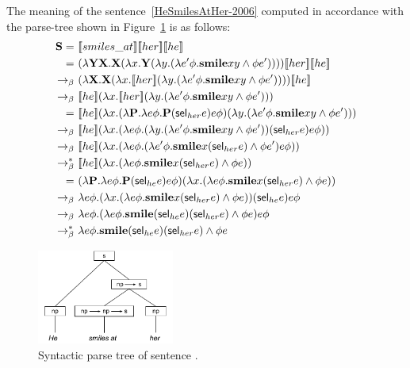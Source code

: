 \begin{example} \label{ex:2006:HeSmilesAtHer} The meaning of the sentence~\eqref{HeSmilesAtHer-2006} computed in accordance with the parse-tree shown in Figure~\ref{fig:ptS3-2006}  is as follows:
\begin{align}
\S = \ & \I{smiles\_at} \I{her} \I{he} \notag \\
 = \ & (\lambda \Y2 \X2. \X2( \lambda \x1. \Y2 (\lambda \y1. ( \lambda e' \phi. \textbf{smile} \x1 \y1 \land \phi e' ))) )  \I{her} \I{he} \notag \\
\bconv \ & (\lambda  \X2. \X2( \lambda \x1.  \I{her}  (\lambda \y1. ( \lambda e' \phi. \textbf{smile} \x1 \y1 \land \phi e' ))) ) \I{he} \notag \\
\bconv \ &   \I{he} ( \lambda \x1.  \I{her}  (\lambda \y1. ( \lambda e' \phi. \textbf{smile} \x1 \y1 \land \phi e' ))) \notag  \\
= \ &   \I{he} ( \lambda \x1.  (\lambda \P2. \lambda e \phi. \P2 (\selK_{her}e)e\phi)  (\lambda \y1. ( \lambda e' \phi. \textbf{smile} \x1 \y1 \land \phi e' ))) \notag \\
 \bconv \ &   \I{he} ( \lambda \x1.  (\lambda e \phi.  (\lambda \y1. ( \lambda e' \phi. \textbf{smile} \x1 \y1 \land \phi e' )) (\selK_{her}e)e\phi) ) \notag \\
  \bconv \ &   \I{he} ( \lambda \x1.  (\lambda e \phi.   ( \lambda e' \phi. \textbf{smile} \x1  (\selK_{her}e) \land \phi e' ) e\phi) ) \notag \\
 \bred \ &   \I{he} ( \lambda \x1.  (\lambda e \phi.  \textbf{smile} \x1  (\selK_{her}e) \land \phi e) ) \notag \\
  = \ &  (\lambda \P2. \lambda e \phi. \P2 (\selK_{he}e)e\phi) ( \lambda \x1.  (\lambda e \phi.  \textbf{smile} \x1  (\selK_{her}e) \land \phi e) ) \notag \\
\bconv \ & \lambda e \phi. ( \lambda \x1.  (\lambda e \phi.  \textbf{smile} \x1  (\selK_{her}e) \land \phi e) )  (\selK_{he}e)e\phi \notag \\
\bconv \ & \lambda e \phi.   (\lambda e \phi.  \textbf{smile}  (\selK_{he}e)  (\selK_{her}e) \land \phi e) e\phi \notag \\
\bred \ & \lambda e \phi.   \textbf{smile}  (\selK_{he}e)  (\selK_{her}e) \land \phi e \label{eq:2006:HeSmilesAtHer}
\end{align}
\end{example}

\begin{figure}[h]
 \centering
    \includegraphics[width=0.4\textwidth]{images/HeSmilesatHer.pdf}
\caption{Syntactic parse tree of sentence .} \label{fig:ptS3-2006}
\end{figure}

